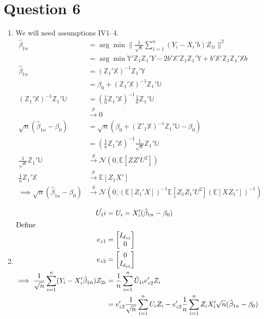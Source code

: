 \documentclass[11pt]{article}
\newcommand{\E}{\mathbb{E}}
\newcommand{\X}{\mathbb{X}}
\newcommand{\Y}{\mathbb{Y}}
\newcommand{\Z}{\mathbb{Z}}
\newcommand{\U}{\mathbb{U}}
\begin{document}
\newpage
\section{Question 6}
\label{sec:orgc4002bc}
  \begin{enumerate}[label=\alph*)]
\item We will need assumptions IV1--4.
\begin{align*}
\hat{\beta}_{1n} &= \arg \min \|\frac{1}{\sqrt{n}} \sum^n_{1 = 1} (Y_i - X_i ' b) Z_{1i}\|^2\\
&= \arg \min  \Y' \Z_1 \Z_1' Y - 2b'\X'\Z_1 \Z_1' \Y + b'\X'\Z_1\Z_1'\X b\\
\hat{\beta}_{1n} &= (\Z_1'\X)^{-1}\Z_1' \Y \tag{FOC}\\
&= \beta_0 + (\Z_1'\X)^{-1}\Z_1'\U\\
(\Z_1'\X)^{-1}\Z_1'\U &= \left(\frac{1}{n} \Z_1' \X\right)^{-1} \frac{1}{n}\Z_1'\U\\
&\overset{p}{\to} 0\\
\sqrt{n}(\hat{\beta}_{1n} - \beta_0) &= \sqrt{n} (\beta_0 + (\Z'_1 \X)^{-1} \Z_1'\U - \beta_0)\\
&= \left(\frac{1}{n} \Z_1' \X \right)^{-1} \frac{1}{\sqrt{n}} \Z_1' \U\\
\frac{1}{\sqrt{n}}\Z_1' \U &\overset{d}{\to} \mathcal{N}(0, \E[ZZ'U^2])\\
\frac{1}{n}\Z_1'\X &\overset{p}{\to} \E[Z_1X']\\
\implies \sqrt{n}(\hat{\beta}_{1n} - \beta_0) &\overset{d}{\to}\mathcal{N}(0, (\E[Z_1' X])^{-1} \E[Z_1 Z_1' U^2](\E[XZ_1'])^{-1})
\end{align*}
\item
\begin{align*}
\hat{U_1i} &= U_i = X_i'(\hat{\beta}_{1n} - \beta_0)\\
\intertext{Define}
e_{z1} &= \begin{bmatrix} I_{d_{z1}} \\ 0 \end{bmatrix}\\
e_{z2} &= \begin{bmatrix} 0 \\ I_{d_{z2}} \end{bmatrix}\\
\implies \frac{1}{\sqrt{n}} \sum^n_{i  = 1} (Y_i - X_i'\hat{\beta}_{1n}) Z_{2i} &= \frac{1}{n}\sum^{n}_{i = 1} \hat{U}_{1i} e'_{z2}Z_i\\
&= e'_{z2} \frac{1}{\sqrt{n}} \sum^n_{i = 1} U_i Z_i - e_{z2}' \frac{1}{n} \sum^n_{i = 1} Z_i X_i' \sqrt{n} (\hat{\beta}_{1n} - \beta_0)\\

\end{align*}
\end{enumerate}
\end{document}

